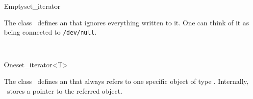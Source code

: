 \begin{ccRefClass}{Emptyset_iterator}
  \label{sectionEmptysetIterator}

  
  \ccDefinition The class \ccClassName\ defines an
   that ignores everything written to it. One can
  think of it as being connected to \texttt{/dev/null}.


  \ccIsModel
  
  \ccCreation

  
  
  \ccSeeAlso
  \\

\end{ccRefClass}

\begin{ccRefClass}{Oneset_iterator<T>}
  \label{sectionOnesetIterator}

  
  \ccDefinition The class \ccClassTemplateName\ defines an
   that always refers to one specific
  object of type .  Internally, \ccClassTemplateName\ stores a
  pointer to the referred object.
  

  \ccIsModel
  
  \ccCreation

  
  \ccTagFullDeclarations{}\ccTagDefaults
  
  \ccSeeAlso
  \\

\end{ccRefClass}

